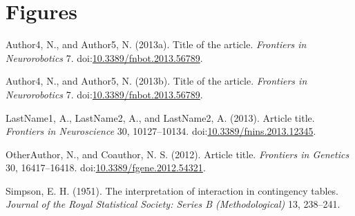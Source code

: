 \documentclass[utf8]{frontiersSCNS}
\begin{document}
\hypertarget{figures}{%
\section*{Figures}\label{figures}}

\hypertarget{refs}{}
\leavevmode\hypertarget{ref-Neurobot2013}{}%
Author4, N., and Author5, N. (2013a). Title of the article.
\emph{Frontiers in Neurorobotics} 7.
doi:\href{https://doi.org/10.3389/fnbot.2013.56789}{10.3389/fnbot.2013.56789}.

\leavevmode\hypertarget{ref-simpsonlink2021}{}%
Author4, N., and Author5, N. (2013b). Title of the article.
\emph{Frontiers in Neurorobotics} 7.
doi:\href{https://doi.org/10.3389/fnbot.2013.56789}{10.3389/fnbot.2013.56789}.

\leavevmode\hypertarget{ref-Neuro2013}{}%
LastName1, A., LastName2, A., and LastName2, A. (2013). Article title.
\emph{Frontiers in Neuroscience} 30, 10127--10134.
doi:\href{https://doi.org/10.3389/fnins.2013.12345}{10.3389/fnins.2013.12345}.

\leavevmode\hypertarget{ref-Gene2012}{}%
OtherAuthor, N., and Coauthor, N. S. (2012). Article title.
\emph{Frontiers in Genetics} 30, 16417--16418.
doi:\href{https://doi.org/10.3389/fgene.2012.54321}{10.3389/fgene.2012.54321}.

\leavevmode\hypertarget{ref-simpson1951interpretation}{}%
Simpson, E. H. (1951). The interpretation of interaction in contingency
tables. \emph{Journal of the Royal Statistical Society: Series B
(Methodological)} 13, 238--241.
\end{document}
